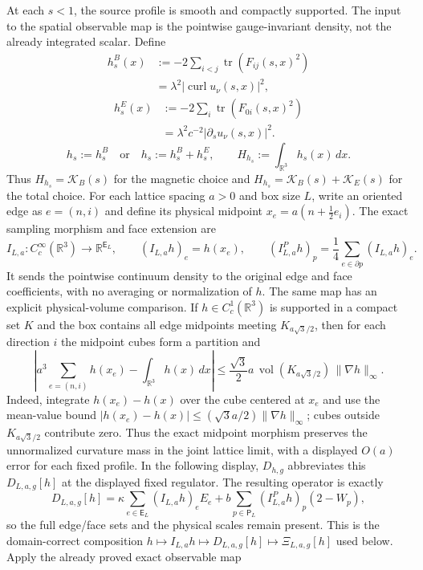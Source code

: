 \documentclass[11pt]{article}
\begin{document}
At each $s<1$, the source profile is smooth and compactly supported.  The input to the spatial observable map is the pointwise gauge-invariant density, not the already integrated scalar.  Define
\[
\begin{aligned}
 h_s^{B}(x)&:=-2\sum_{i<j}\operatorname{tr}(F_{ij}(s,x)^2)\\
            &=\lambda^2|\operatorname{curl}u_\nu(s,x)|^2,
\end{aligned}
\]
\[
\begin{aligned}
 h_s^{E}(x)&:=-2\sum_i\operatorname{tr}(F_{0i}(s,x)^2)\\
            &=\lambda^2c^{-2}|\partial_su_\nu(s,x)|^2.
\end{aligned}
\]
\[
 h_s:=h_s^{B}\quad\text{or}\quad h_s:=h_s^{B}+h_s^{E},\qquad
 H_{h_s}:=\int_{\mathbb R^3}h_s(x)\,dx.
\]
Thus $H_{h_s}=\mathcal K_B(s)$ for the magnetic choice and $H_{h_s}=\mathcal K_B(s)+\mathcal K_E(s)$ for the total choice.  For each lattice spacing $a>0$ and box size $L$, write an oriented edge as $e=(n,i)$ and define its physical midpoint $x_e=a(n+\tfrac12e_i)$.  The exact sampling morphism and face extension are
\[
 I_{L,a}:C_c^\infty(\mathbb R^3)\longrightarrow\mathbb R^{\mathsf E_L},\qquad (I_{L,a}h)_e=h(x_e),\qquad
 (I^P_{L,a}h)_p=\frac14\sum_{e\in\partial p}(I_{L,a}h)_e.
\]
It sends the pointwise continuum density to the original edge and face coefficients, with no averaging or normalization of $h$.  The same map has an explicit physical-volume comparison.  If $h\in C_c^1(\mathbb R^3)$ is supported in a compact set $K$ and the box contains all edge midpoints meeting $K_{a\sqrt3/2}$, then for each direction $i$ the midpoint cubes form a partition and
\[
 \left|a^3\sum_{e=(n,i)}h(x_e)-\int_{\mathbb R^3}h(x)\,dx\right|
 \le \frac{\sqrt3}{2}a\,\operatorname{vol}(K_{a\sqrt3/2})\,\|\nabla h\|_\infty.
\]
Indeed, integrate $h(x_e)-h(x)$ over the cube centered at $x_e$ and use the mean-value bound $|h(x_e)-h(x)|\le(\sqrt3a/2)\|\nabla h\|_\infty$; cubes outside $K_{a\sqrt3/2}$ contribute zero.  Thus the exact midpoint morphism preserves the unnormalized curvature mass in the joint lattice limit, with a displayed $O(a)$ error for each fixed profile.  In the following display, $D_{h,g}$ abbreviates this $D_{L,a,g}[h]$ at the displayed fixed regulator.  The resulting operator is exactly
\[
 D_{L,a,g}[h]=\kappa\sum_{e\in\mathsf E_L}(I_{L,a}h)_eE_e
 +b\sum_{p\in\mathsf P_L}(I^P_{L,a}h)_p(2-W_p),
\]
so the full edge/face sets and the physical scales remain present.  This is the domain-correct composition $h\mapsto I_{L,a}h\mapsto D_{L,a,g}[h]\mapsto\Xi_{L,a,g}[h]$ used below.  Apply the already proved exact observable map
\end{document}
